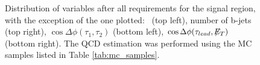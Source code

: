 \begin{figure}[H]
\begin{center}
 \captionsetup[subfloat]{farskip=0pt,captionskip=0.0cm,labelformat=empty}
 \end{center}
 \caption{Distribution of variables after all requirements for the signal region, with the exception of the
one plotted: \MET~(top left), number of b-jets (top right), $\cos\Delta \phi (\tau_{1},\tau_{2})$ (bottom left), 
$\cos\Delta \phi (\tau_{lead}, \not\!\!E_T)$ (bottom right). The QCD estimation was performed using the MC samples listed in Table \ref{tab:mc_samples}.}
\label{nminusone_MC} 
 \end{figure}
 
